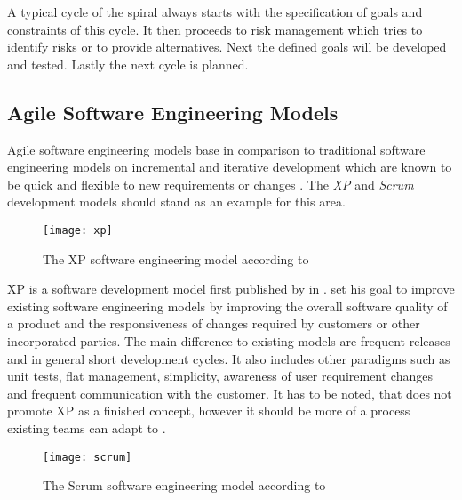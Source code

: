 A typical cycle of the spiral always starts with the specification of goals and
constraints of this cycle. It then proceeds to risk management which tries to
identify risks or to provide alternatives. Next the defined goals will be
developed and tested. Lastly the next cycle is planned.


\subsection{Agile Software Engineering Models} %

Agile software engineering models base in comparison to traditional software
engineering models on incremental and iterative development which are known to
be quick and flexible to new requirements or changes \cite{Beck1999}. The
\emph{\acl{XP}} and \emph{Scrum} development models should stand as an example
for this area.

\begin{figure}[htbp]
  \centering
  \texttt{[image: xp]}
  \caption{The \acl{XP} software engineering model according to \textcite{Beck1999a}}
\end{figure}

\ac{XP} is a software development model first published by
\citeauthor{Beck1999} \cite{Beck1999a} in \citeyear{Beck1999}.
\citeauthor{Beck1999} set his goal to improve existing software engineering
models by improving the overall software quality of a product and the
responsiveness of changes required by customers or other incorporated parties.
The main difference to existing models are frequent releases and in general
short development cycles. It also includes other paradigms such as unit tests,
flat management, simplicity, awareness of user requirement changes and frequent
communication with the customer. It has to be noted, that \citeauthor{Beck1999}
does not promote \acl{XP} as a finished concept, however it should be more of a
process existing teams can adapt to \cite{Beck1999}.

\begin{figure}[htbp]
  \centering
  \texttt{[image: scrum]}
  \caption{The Scrum software engineering model according to \textcite{Schwaber1995}}
\end{figure}

